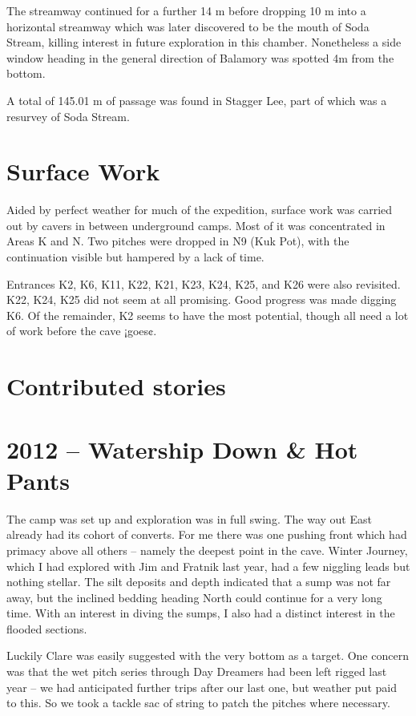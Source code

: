 The streamway continued for a further 14 m before dropping 10 m into a
horizontal streamway which was later discovered to be the mouth of Soda
Stream, killing interest in future exploration in this chamber.
Nonetheless a side window heading in the general direction of Balamory
was spotted 4m from the bottom.

A total of 145.01 m of passage was found in Stagger Lee, part of which
was a resurvey of Soda Stream.

\section{Surface Work}\label{surface-work}

Aided by perfect weather for much of the expedition, surface work was
carried out by cavers in between underground camps. Most of it was
concentrated in Areas K and N. Two pitches were dropped in N9 (Kuk Pot),
with the continuation visible but hampered by a lack of time.

Entrances K2, K6, K11, K22, K21, K23, K24, K25, and K26 were also
revisited. K22, K24, K25 did not seem at all promising. Good progress
was made digging K6. Of the remainder, K2 seems to have the most
potential, though all need a lot of work before the cave ¡goes¢.

\section{Contributed stories}\label{contributed-stories-1}

\section{2012 -- Watership Down \& Hot
Pants}\label{watership-down-hot-pants}

The camp was set up and exploration was in full swing. The way out East
already had its cohort of converts. For me there was one pushing front
which had primacy above all others -- namely the deepest point in the
cave. Winter Journey, which I had explored with Jim and Fratnik last
year, had a few niggling leads but nothing stellar. The silt deposits
and depth indicated that a sump was not far away, but the inclined
bedding heading North could continue for a very long time. With an
interest in diving the sumps, I also had a distinct interest in the
flooded sections.

Luckily Clare was easily suggested with the very bottom as a target. One
concern was that the wet pitch series through Day Dreamers had been left
rigged last year -- we had anticipated further trips after our last one,
but weather put paid to this. So we took a tackle sac of string to patch
the pitches where necessary.

